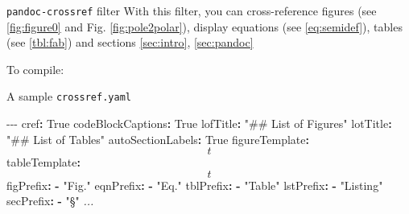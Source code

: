 \documentclass[
  10pt,
  ignorenonframetext,
  serif,onlymath]{beamer}
\newenvironment{Shaded}{}{}
\newcommand{\AttributeTok}[1]{\textcolor[rgb]{0.49,0.56,0.16}{#1}}
\newcommand{\CharTok}[1]{\textcolor[rgb]{0.25,0.44,0.63}{#1}}
\newcommand{\CommentTok}[1]{\textcolor[rgb]{0.38,0.63,0.69}{\textit{#1}}}
\newcommand{\DataTypeTok}[1]{\textcolor[rgb]{0.56,0.13,0.00}{#1}}
\newcommand{\ExtensionTok}[1]{#1}
\newcommand{\FunctionTok}[1]{\textcolor[rgb]{0.02,0.16,0.49}{#1}}
\newcommand{\KeywordTok}[1]{\textcolor[rgb]{0.00,0.44,0.13}{\textbf{#1}}}
\newcommand{\NormalTok}[1]{#1}
\newcommand{\PreprocessorTok}[1]{\textcolor[rgb]{0.74,0.48,0.00}{#1}}
\newcommand{\StringTok}[1]{\textcolor[rgb]{0.25,0.44,0.63}{#1}}
\begin{document}
\begin{frame}[fragile]{\texttt{pandoc-crossref} filter}
\protect\hypertarget{pandoc-crossref-filter-1}{}
With this filter, you can cross-reference figures (see
\cref{fig:figure0} and Fig. \ref{fig:pole2polar}), display equations
(see \cref{eq:semidef}), tables (see \cref{tbl:fab}) and sections
\cref{sec:intro}, \cref{sec:pandoc}

To compile:

\begin{Shaded}
\end{Shaded}
\end{frame}

\begin{frame}[fragile]{A sample \texttt{crossref.yaml}}
\protect\hypertarget{a-sample-crossref.yaml}{}
\scriptsize

\begin{Shaded}
\begin{Highlighting}[]
\PreprocessorTok{{-}{-}{-}}
\FunctionTok{cref}\KeywordTok{:}\AttributeTok{ }\CharTok{True}
\FunctionTok{codeBlockCaptions}\KeywordTok{:}\AttributeTok{ }\CharTok{True}
\FunctionTok{lofTitle}\KeywordTok{:}\AttributeTok{ }\StringTok{"\#\# List of Figures"}
\FunctionTok{lotTitle}\KeywordTok{:}\AttributeTok{ }\StringTok{"\#\# List of Tables"}
\FunctionTok{autoSectionLabels}\KeywordTok{:}\AttributeTok{ }\CharTok{True}
\FunctionTok{figureTemplate}\KeywordTok{:}\AttributeTok{ $$t$$}
\FunctionTok{tableTemplate}\KeywordTok{:}\AttributeTok{ $$t$$}
\FunctionTok{figPrefix}\KeywordTok{:}
\AttributeTok{  }\KeywordTok{{-}}\AttributeTok{ }\StringTok{"Fig."}
\FunctionTok{eqnPrefix}\KeywordTok{:}
\AttributeTok{  }\KeywordTok{{-}}\AttributeTok{ }\StringTok{"Eq."}
\FunctionTok{tblPrefix}\KeywordTok{:}
\AttributeTok{  }\KeywordTok{{-}}\AttributeTok{ }\StringTok{"Table"}
\FunctionTok{lstPrefix}\KeywordTok{:}
\AttributeTok{  }\KeywordTok{{-}}\AttributeTok{ }\StringTok{"Listing"}
\FunctionTok{secPrefix}\KeywordTok{:}
\AttributeTok{  }\KeywordTok{{-}}\AttributeTok{ }\StringTok{"§"}
\CommentTok{...}
\end{Highlighting}
\end{Shaded}
\end{frame}
\end{document}

